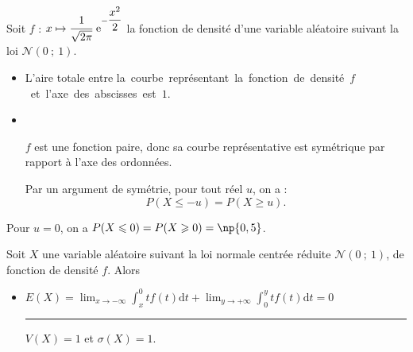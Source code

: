 \documentclass{cornouaille}
\begin{document}
\begin{propriete}
Soit $f$ : $x\mapsto \cfrac{1}{\sqrt{2\pi}}\text{ e}^{-\dfrac{x^2}{2}}$ la fonction de densité d'une variable aléatoire suivant la loi $\mathcal{N}(0\ ;\ 1)$.
\begin{itemize}
\item L'aire totale entre \hbox{la courbe représentant la fonction de densité $f$ et l'axe des abscisses est $1$.}
	\item ~~

 \begin{minipage}{0.6\linewidth}
   $f$ est une fonction paire, donc sa courbe représentative est symétrique par rapport à l'axe des ordonnées.

   Par un argument de symétrie, pour tout réel $u$, on a :	
	 $$P(X\leqslant -u)=P(X\geqslant u).$$
 \end{minipage}
 \hfill
 \begin{minipage}{0.4\linewidth}
   \begin{center}
\end{center}
 \end{minipage}
\end{itemize}
\end{propriete}

\begin{remarque}
 Pour $u=0$, on a $P(X\leqslant 0)=P(X\geqslant 0)=\np{0,5}$.
 \end{remarque}

\begin{propriete}
Soit $X$ une variable aléatoire suivant la loi normale centrée réduite $\mathcal{N}(0\ ;\ 1)$, de fonction de densité $f$. Alors
\begin{itemize}
	\item $E(X)=\displaystyle \lim_{x \rightarrow -\infty}
          \int_x^0 tf(t)\textrm{d} t+ \displaystyle \lim_{y
            \rightarrow +\infty} \int_0^y tf(t)\textrm{d} t=0$
          \qquad
          \textcolor{DefSquareColor}{\rule{1.5mm}{1.5mm}}\hspace{2mm}%
         $V(X)=1$ et $\sigma(X)=1$.
\end{itemize}
\end{propriete}
\end{document}

